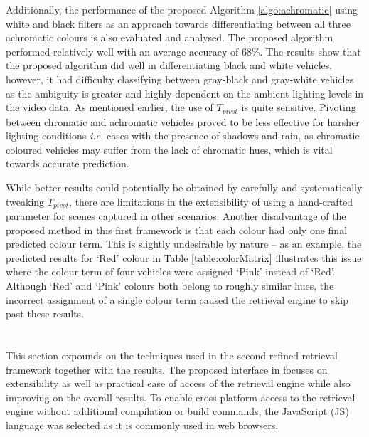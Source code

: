 Additionally, the performance of the proposed Algorithm \ref{algo:achromatic} using
white and black filters as an approach towards differentiating between all three achromatic colours is also evaluated and analysed. The proposed algorithm performed relatively well with an average accuracy of 68\%. The results show that the
proposed algorithm did well in differentiating black and white vehicles, however, it had difficulty classifying between gray-black and gray-white
vehicles as the ambiguity is greater and highly dependent on the ambient lighting levels in the video data.
As mentioned earlier, the use of $T_{pivot}$ is quite sensitive.
Pivoting between chromatic and achromatic vehicles proved to be less effective for harsher
lighting conditions \emph{i.e.} cases with the presence of shadows and rain, as %
chromatic coloured vehicles may suffer from the lack of chromatic hues, which is vital towards accurate prediction.

While better results could potentially be obtained by carefully and
systematically tweaking $T_{pivot}$, there are limitations in the extensibility of using a hand-crafted parameter for scenes captured in other scenarios. %
Another disadvantage of the proposed method in this first framework is that each colour had only one final predicted colour
term. This is slightly undesirable by nature -- as an example, the predicted results for `Red' colour in Table \ref{table:colorMatrix} illustrates this issue where
the colour term of four vehicles were assigned `Pink' instead of `Red'. Although `Red' and `Pink' colours both belong to roughly similar hues, the incorrect assignment of a single colour term caused the retrieval engine to skip past these results.





\section{\versionTwoRet}
\label{section:versionTwo}

This section expounds on the techniques used in the second refined retrieval framework together with the results. The proposed interface in \versionTwoRet focuses on extensibility as well as practical ease of access of the retrieval engine while also improving on the overall results. To enable cross-platform access to the retrieval engine without additional compilation or build commands, the JavaScript (JS) language was selected as it is commonly used in web browsers.

